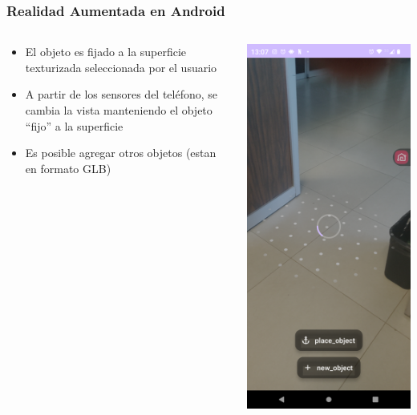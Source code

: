 \documentclass[aspectratio=169,compress]{beamer}
\begin{document}
\begin{frame}[fragile]
\frametitle{Realidad Aumentada en Android}
\begin{columns}
\begin{column}{0.48\textwidth}
\begin{itemize}
\item El objeto es fijado a la superficie texturizada seleccionada por el usuario
\item A partir de los sensores del teléfono, se cambia la vista manteniendo el objeto ``fijo'' a la superficie
\item Es posible agregar otros objetos (estan en formato GLB)

\end{itemize}
\end{column}
\begin{column}{0.48\textwidth}
\includegraphics[width=0.45\linewidth]{PantallazosDemoTaller/Demo16-1.png}

\end{column}
\end{columns}
\end{frame}
\end{document}
